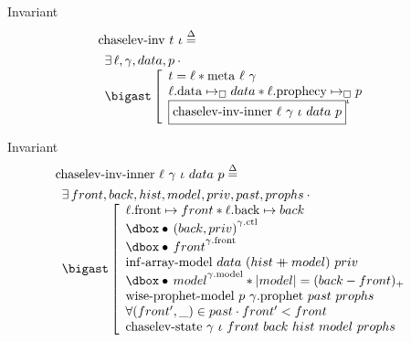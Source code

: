 \begin{frame}{Invariant}
\begin{align*}
		&\mathrm{chaselev \mathhyphen inv}\ t\ \iota
		\eqdef
	\\
		&\begin{array}{l}
				\exists \ell, \gamma, data, p \cdot \phantom{}
			\\
				\iBigsep\left[\begin{array}{l}
						t = \ell \iSep
						\mathrm{meta}\ \ell\ \gamma
					\\
						\ell\mathrm{.data} \mapsto_\square data \iSep
						\ell\mathrm{.prophecy} \mapsto_\square p
					\\
						\iInv{\iota}{\mathrm{chaselev \mathhyphen inv \mathhyphen inner}\ \ell\ \gamma\ \iota\ data\ p}
				\end{array}\right.
		\end{array}
\end{align*}
\end{frame}


\begin{frame}{Invariant}
\begin{align*}
		&\mathrm{chaselev \mathhyphen inv \mathhyphen inner}\ \ell\ \gamma\ \iota\ data\ p
		\eqdef
	\\
		&\begin{array}{l}
				\exists front, back, hist, model, priv, past, prophs \cdot \phantom{}
			\\
				\iBigsep\left[\begin{array}{l}
						\ell\mathrm{.front} \mapsto front \iSep
						\ell\mathrm{.back} \mapsto back
					\\
						\iGhost{\gamma\mathrm{.ctl}}{\iAuth{(back, priv)}}
					\\
						\iGhost{\gamma\mathrm{.front}}{\iAuth{front}}
					\\
						\mathrm{inf \mathhyphen array \mathhyphen model}\ data\ (hist \mdoubleplus model)\ priv
					\\
						\iGhost{\gamma\mathrm{.model}}{\iAuth{model}} \iSep
						| model | = (back - front)_+
					\\
						\mathrm{wise \mathhyphen prophet \mathhyphen model}\ p\ \gamma\mathrm{.prophet}\ past\ prophs
					\\
						\forall (front', \_) \in past \cdot front' < front
					\\
						\mathrm{chaselev \mathhyphen state}\ \gamma\ \iota\ front\ back\ hist\ model\ prophs
				\end{array}\right.
		\end{array}
\end{align*}
\end{frame}